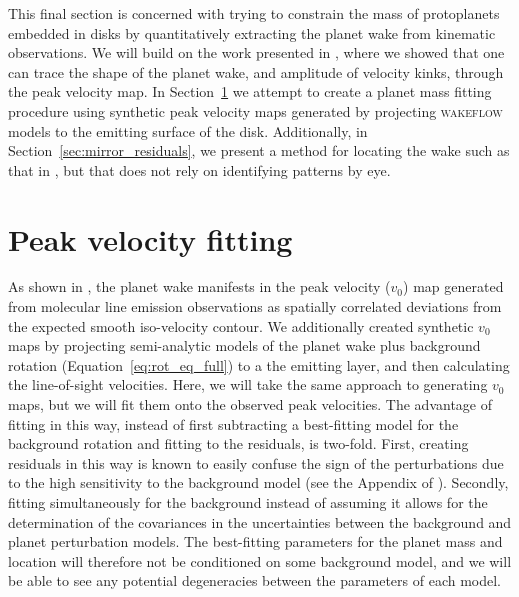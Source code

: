 This final section is concerned with trying to constrain the mass of protoplanets embedded in disks by quantitatively extracting the planet wake from kinematic observations.
We will build on the work presented in \citet{calcino2022}, where we showed that one can trace the shape of the planet wake, and amplitude of velocity kinks, through the peak velocity map.
In Section~\ref{sec:v0_fitting} we attempt to create a planet mass fitting procedure using synthetic peak velocity maps generated by projecting \textsc{wakeflow} models to the emitting surface of the disk.
Additionally, in Section~\ref{sec:mirror_residuals}, we present a method for locating the wake such as that in \citet{calcino2022}, but that does not rely on identifying patterns by eye.

\section{Peak velocity fitting} \label{sec:v0_fitting}

As shown in \citet{calcino2022}, the planet wake manifests in the peak velocity ($v_0$) map generated from molecular line emission observations as spatially correlated deviations from the expected smooth iso-velocity contour.
We additionally created synthetic $v_0$ maps by projecting semi-analytic models of the planet wake plus background rotation (Equation~\ref{eq:rot_eq_full}) to a the emitting layer, and then calculating the line-of-sight velocities.
Here, we will take the same approach to generating $v_0$ maps, but we will fit them onto the observed peak velocities.
The advantage of fitting in this way, instead of first subtracting a best-fitting model for the background rotation and fitting to the residuals, is two-fold.
First, creating residuals in this way is known to easily confuse the sign of the perturbations due to the high sensitivity to the background model (see the Appendix of \citealt{calcino2022}).
Secondly, fitting simultaneously for the background instead of assuming it allows for the determination of the covariances in the uncertainties between the background and planet perturbation models.
The best-fitting parameters for the planet mass and location will therefore not be conditioned on some background model, and we will be able to see any potential degeneracies between the parameters of each model.

